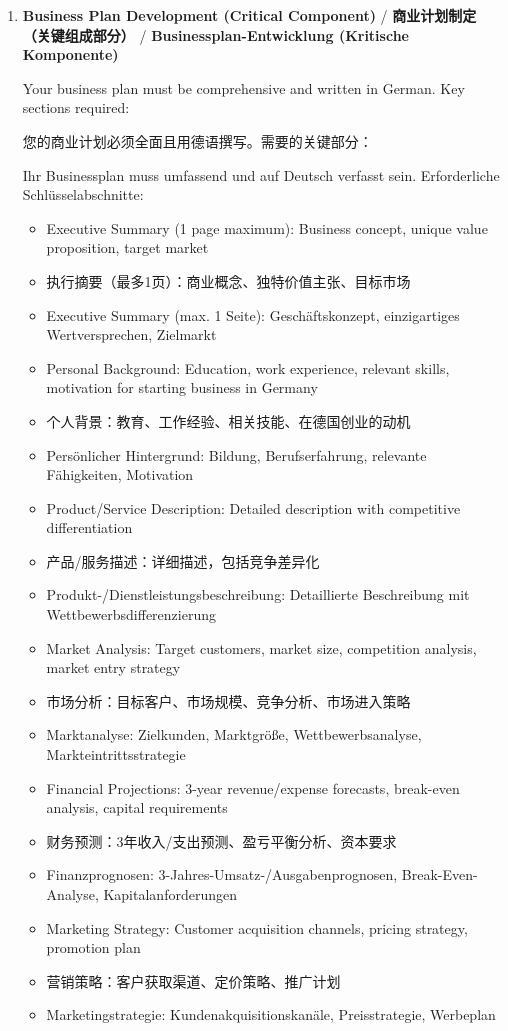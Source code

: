\begin{enumerate}
    \item \textbf{Business Plan Development (Critical Component)} / \textbf{商业计划制定（关键组成部分）} / \textbf{Businessplan-Entwicklung (Kritische Komponente)}
    
    Your business plan must be comprehensive and written in German. Key sections required:
    
    您的商业计划必须全面且用德语撰写。需要的关键部分：
    
    Ihr Businessplan muss umfassend und auf Deutsch verfasst sein. Erforderliche Schlüsselabschnitte:
    \begin{itemize}
        \item Executive Summary (1 page maximum): Business concept, unique value proposition, target market
        \item 执行摘要（最多1页）：商业概念、独特价值主张、目标市场
        \item Executive Summary (max. 1 Seite): Geschäftskonzept, einzigartiges Wertversprechen, Zielmarkt
        \item Personal Background: Education, work experience, relevant skills, motivation for starting business in Germany
        \item 个人背景：教育、工作经验、相关技能、在德国创业的动机
        \item Persönlicher Hintergrund: Bildung, Berufserfahrung, relevante Fähigkeiten, Motivation
        \item Product/Service Description: Detailed description with competitive differentiation
        \item 产品/服务描述：详细描述，包括竞争差异化
        \item Produkt-/Dienstleistungsbeschreibung: Detaillierte Beschreibung mit Wettbewerbsdifferenzierung
        \item Market Analysis: Target customers, market size, competition analysis, market entry strategy
        \item 市场分析：目标客户、市场规模、竞争分析、市场进入策略
        \item Marktanalyse: Zielkunden, Marktgröße, Wettbewerbsanalyse, Markteintrittsstrategie
        \item Financial Projections: 3-year revenue/expense forecasts, break-even analysis, capital requirements
        \item 财务预测：3年收入/支出预测、盈亏平衡分析、资本要求
        \item Finanzprognosen: 3-Jahres-Umsatz-/Ausgabenprognosen, Break-Even-Analyse, Kapitalanforderungen
        \item Marketing Strategy: Customer acquisition channels, pricing strategy, promotion plan
        \item 营销策略：客户获取渠道、定价策略、推广计划
        \item Marketingstrategie: Kundenakquisitionskanäle, Preisstrategie, Werbeplan
    \end{itemize}
    

\end{enumerate}

